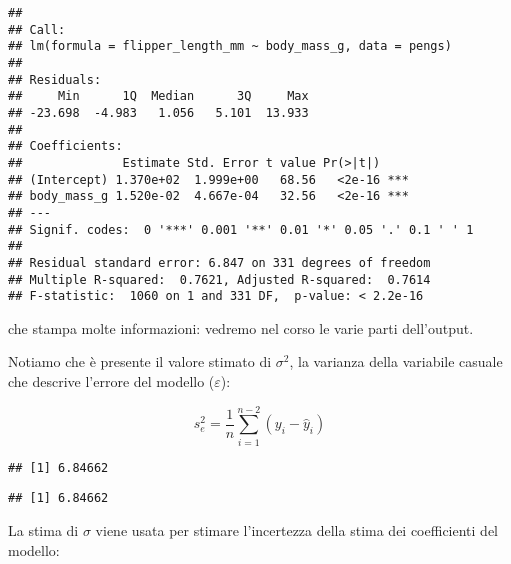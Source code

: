 \documentclass[
]{article}
\newenvironment{Shaded}{\begin{snugshade}}{\end{snugshade}}
\newcommand{\DecValTok}[1]{\textcolor[rgb]{0.00,0.00,0.81}{#1}}
\newcommand{\FunctionTok}[1]{\textcolor[rgb]{0.00,0.00,0.00}{#1}}
\newcommand{\NormalTok}[1]{#1}
\newcommand{\SpecialCharTok}[1]{\textcolor[rgb]{0.00,0.00,0.00}{#1}}
\begin{document}
\begin{verbatim}
## 
## Call:
## lm(formula = flipper_length_mm ~ body_mass_g, data = pengs)
## 
## Residuals:
##     Min      1Q  Median      3Q     Max 
## -23.698  -4.983   1.056   5.101  13.933 
## 
## Coefficients:
##              Estimate Std. Error t value Pr(>|t|)    
## (Intercept) 1.370e+02  1.999e+00   68.56   <2e-16 ***
## body_mass_g 1.520e-02  4.667e-04   32.56   <2e-16 ***
## ---
## Signif. codes:  0 '***' 0.001 '**' 0.01 '*' 0.05 '.' 0.1 ' ' 1
## 
## Residual standard error: 6.847 on 331 degrees of freedom
## Multiple R-squared:  0.7621, Adjusted R-squared:  0.7614 
## F-statistic:  1060 on 1 and 331 DF,  p-value: < 2.2e-16
\end{verbatim}

che stampa molte informazioni: vedremo nel corso le varie parti
dell'output.

Notiamo che è presente il valore stimato di \(\sigma^2\), la varianza
della variabile casuale che descrive l'errore del modello
(\(\varepsilon\)):

\[s_e^2 = \frac{1}{n}\sum_{i=1}^{n-2} (y_i - \hat{y}_i)\]

\begin{Shaded}
\end{Shaded}

\begin{verbatim}
## [1] 6.84662
\end{verbatim}

\begin{Shaded}
\end{Shaded}

\begin{verbatim}
## [1] 6.84662
\end{verbatim}

La stima di \(\sigma\) viene usata per stimare l'incertezza della stima
dei coefficienti del modello:
\end{document}
